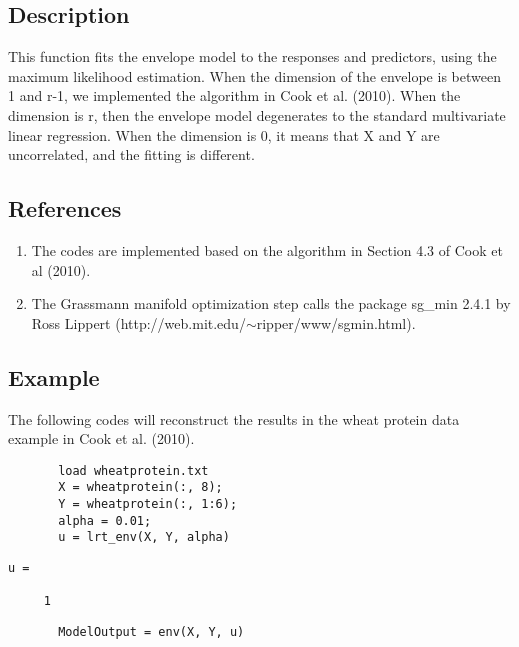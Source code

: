 \documentclass[a4paper,11pt,openany]{memoir}
\begin{document}
\subsection*{Description}

\begin{par}
This function fits the envelope model to the responses and predictors, using the maximum likelihood estimation.  When the dimension of the envelope is between 1 and r-1, we implemented the algorithm in Cook et al. (2010).  When the dimension is r, then the envelope model degenerates to the standard multivariate linear regression.  When the dimension is 0, it means that X and Y are uncorrelated, and the fitting is different.
\end{par} \vspace{1em}


\subsection*{References}

\begin{enumerate}
\setlength{\itemsep}{-1ex}
   \item The codes are implemented based on the algorithm in Section 4.3 of Cook et al (2010).
   \item The Grassmann manifold optimization step calls the package sg\_min 2.4.1 by Ross Lippert (http://web.mit.edu/$\sim$ripper/www/sgmin.html).
\end{enumerate}


\subsection*{Example}

\begin{par}
The following codes will reconstruct the results in the wheat protein data example in Cook et al. (2010).
\end{par} \vspace{1em}

\begin{verbatim}       load wheatprotein.txt
       X = wheatprotein(:, 8);
       Y = wheatprotein(:, 1:6);
       alpha = 0.01;
       u = lrt_env(X, Y, alpha)
\end{verbatim}    
        \color{lightgray}\ttfamily \begin{verbatim}
u =

     1
\end{verbatim} \rmfamily
\color{black}
       \begin{verbatim}
       ModelOutput = env(X, Y, u)
\end{verbatim}    
\end{document}
